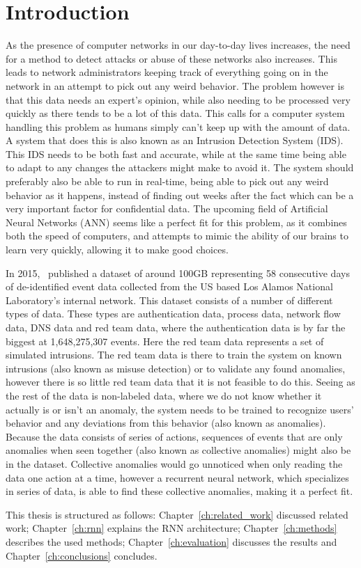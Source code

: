 \chapter{Introduction}\label{ch:introduction}
As the presence of computer networks in our day-to-day lives increases, the need for a method to detect attacks or abuse of these networks also increases. This leads to network administrators keeping track of everything going on in the network in an attempt to pick out any weird behavior. The problem however is that this data needs an expert's opinion, while also needing to be processed very quickly as there tends to be a lot of this data. This calls for a computer system handling this problem as humans simply can't keep up with the amount of data. A system that does this is also known as an Intrusion Detection System (IDS). This IDS needs to be both fast and accurate, while at the same time being able to adapt to any changes the attackers might make to avoid it. The system should preferably also be able to run in real-time, being able to pick out any weird behavior as it happens, instead of finding out weeks after the fact which can be a very important factor for confidential data. The upcoming field of Artificial Neural Networks (ANN) seems like a perfect fit for this problem, as it combines both the speed of computers, and attempts to mimic the ability of our brains to learn very quickly, allowing it to make good choices.

In 2015,~\cite{akent-2015-enterprise-data} published a dataset of around 100GB representing 58 consecutive days of de-identified event data collected from the US based Los Alamos National Laboratory's internal network. This dataset consists of a number of different types of data. These types are authentication data, process data, network flow data, DNS data and red team data, where the authentication data is by far the biggest at 1,648,275,307 events. Here the red team data represents a set of simulated intrusions. The red team data is there to train the system on known intrusions (also known as misuse detection) or to validate any found anomalies, however there is so little red team data that it is not feasible to do this. Seeing as the rest of the data is non-labeled data, where we do not know whether it actually is or isn't an anomaly, the system needs to be trained to recognize users' behavior and any deviations from this behavior (also known as anomalies). Because the data consists of series of actions, sequences of events that are only anomalies when seen together (also known as collective anomalies) might also be in the dataset. Collective anomalies would go unnoticed when only reading the data one action at a time, however a recurrent neural network, which specializes in series of data, is able to find these collective anomalies, making it a perfect fit.

This thesis is structured as follows: Chapter~\ref{ch:related_work} discussed related work; Chapter~\ref{ch:rnn} explains the RNN architecture; Chapter~\ref{ch:methods} describes the used methods; Chapter~\ref{ch:evaluation} discusses the results and Chapter~\ref{ch:conclusions} concludes.